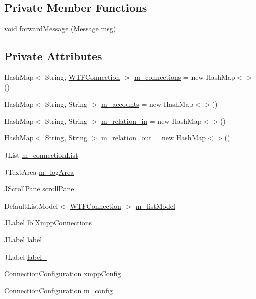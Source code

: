 \subsection*{Private Member Functions}
\begin{DoxyCompactItemize}
\item 
void \hyperlink{class_xmpp_panel_aeaee342f9fe7ca177a16e230d0355342}{forward\-Message} (Message msg)
\end{DoxyCompactItemize}
\subsection*{Private Attributes}
\begin{DoxyCompactItemize}
\item 
Hash\-Map$<$ String, \hyperlink{class_w_t_f_connection}{W\-T\-F\-Connection} $>$ \hyperlink{class_xmpp_panel_ab4b5f0dc078924949ac4c0c4674420d1}{m\-\_\-connections} = new Hash\-Map$<$$>$()
\item 
Hash\-Map$<$ String, String $>$ \hyperlink{class_xmpp_panel_a30ad797e8a0720ddc85a70735ef79383}{m\-\_\-accounts} = new Hash\-Map$<$$>$()
\item 
Hash\-Map$<$ String, String $>$ \hyperlink{class_xmpp_panel_aa982fa1d5105a0ac752e14fae8321eb8}{m\-\_\-relation\-\_\-in} = new Hash\-Map$<$$>$()
\item 
Hash\-Map$<$ String, String $>$ \hyperlink{class_xmpp_panel_af8300e818e7ba4948c1a682c89860706}{m\-\_\-relation\-\_\-out} = new Hash\-Map$<$$>$()
\item 
J\-List \hyperlink{class_xmpp_panel_ab238edcd6185eb41b69800fc8d15ea9b}{m\-\_\-connection\-List}
\item 
J\-Text\-Area \hyperlink{class_xmpp_panel_ae531db25a81474f201775bfbf1ad5451}{m\-\_\-log\-Area}
\item 
J\-Scroll\-Pane \hyperlink{class_xmpp_panel_abbce5c6df3319cb78e4d960d8797e693}{scroll\-Pane\-\_}
\item 
Default\-List\-Model$<$ \hyperlink{class_w_t_f_connection}{W\-T\-F\-Connection} $>$ \hyperlink{class_xmpp_panel_aa10db4c64a73d6034173cfff5aa7bd5d}{m\-\_\-list\-Model}
\item 
J\-Label \hyperlink{class_xmpp_panel_a19972c205e6a5280a1349685e1838b4c}{lbl\-Xmpp\-Connections}
\item 
J\-Label \hyperlink{class_xmpp_panel_a0086126eead014c8117e377a69311589}{label}
\item 
J\-Label \hyperlink{class_xmpp_panel_a380efe027c76a0a6a937d2c9ca73f804}{label\-\_}
\item 
Connection\-Configuration \hyperlink{class_xmpp_panel_a65e1f37487a3e74772abe12930f820ad}{xmpp\-Config}
\item 
Connection\-Configuration \hyperlink{class_xmpp_panel_a04ece31d4df20d37f2cef0f8057b3ba8}{m\-\_\-config}
\end{DoxyCompactItemize}
